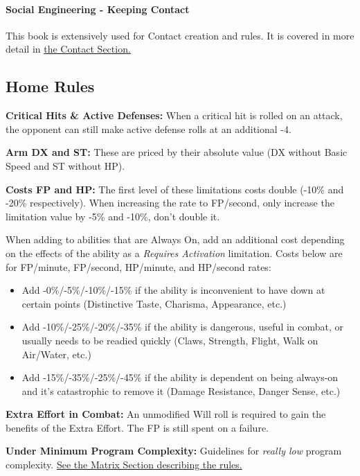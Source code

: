 \begin{multicols*}{3}
\begin{coloredbox}
	\end{coloredbox}
	
	\paragraph{\GURPS Social Engineering - Keeping Contact}
	
	This book is extensively used for Contact creation and rules. It is covered in more detail in \hyperref[Contacts]{the Contact Section.}
	
	\subsection{Home Rules}
	
	\textbf{Critical Hits \& Active Defenses:} When a critical hit is rolled on an attack, the opponent can still make active defense rolls at an additional -4.
	
	\textbf{Arm DX and ST:} These are priced by their absolute value (DX without Basic Speed and ST without HP).
	
	\textbf{Costs FP and HP:} The first level of these limitations costs double (-10\% and -20\% respectively). When increasing the rate to FP/second, only increase the limitation value by -5\% and -10\%, don't double it. 
	
	When adding to abilities that are Always On, add an additional cost depending on the effects of the ability as a \textit{Requires Activation} limitation. Costs below are for FP/minute, FP/second, HP/minute, and HP/second rates:
	\begin{itemize}
		\item Add -0\%/-5\%/-10\%/-15\% if the ability is inconvenient to have down at certain points (Distinctive Taste, Charisma, Appearance, etc.)
		\item Add -10\%/-25\%/-20\%/-35\% if the ability is dangerous, useful in combat, or usually needs to be readied quickly (Claws, Strength, Flight, Walk on Air/Water, etc.)
		\item Add -15\%/-35\%/-25\%/-45\% if the ability is dependent on being always-on and it's catastrophic to remove it (Damage Resistance, Danger Sense, etc.)
	\end{itemize}
	
	\textbf{Extra Effort in Combat:} An unmodified Will roll is required to gain the benefits of the Extra Effort. The FP is still spent on a failure.
	
	\textbf{Under Minimum Program Complexity:} Guidelines for \textit{really low} program complexity. \hyperref[low_complexity]{See the Matrix Section describing the rules.}
	

\end{multicols*}
